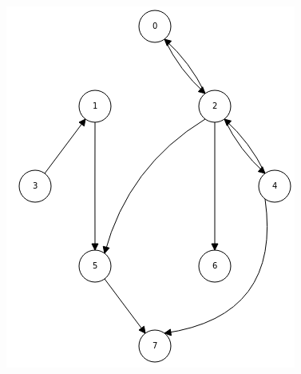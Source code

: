 \documentclass[twocolumn]{article}
\begin{document}
\begin{center}
\includegraphics[scale=0.5]{grafin.png}
\end{center}
\end{document}
